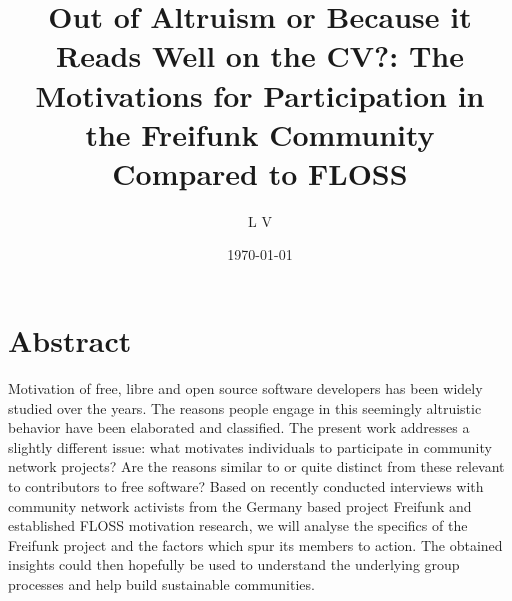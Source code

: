 \documentclass{scrartcl}
\title{Out of Altruism or Because it Reads Well on the CV?: The Motivations for Participation in the Freifunk Community Compared to FLOSS}
\author{L V}
\date{\today}
\begin{document}
\thispagestyle{empty}
\maketitle

\setcounter{tocdepth}{2} %

\tableofcontents %

\newpage


\section*{Abstract} %
  Motivation of free, libre and open source software developers has been widely studied over the years.
  The reasons people engage in this seemingly altruistic behavior have been elaborated and classified.
  The present work addresses a slightly different issue:
  what motivates individuals to participate in community network projects?
  Are the reasons similar to or quite distinct from these relevant to contributors to free software?
  Based on recently conducted interviews with community network activists from the Germany based project Freifunk and established FLOSS motivation research, we will analyse the specifics of the Freifunk project and the factors which spur its members to action.
  The obtained insights could then hopefully be used to understand the underlying group processes and help build sustainable communities.

\end{document}
